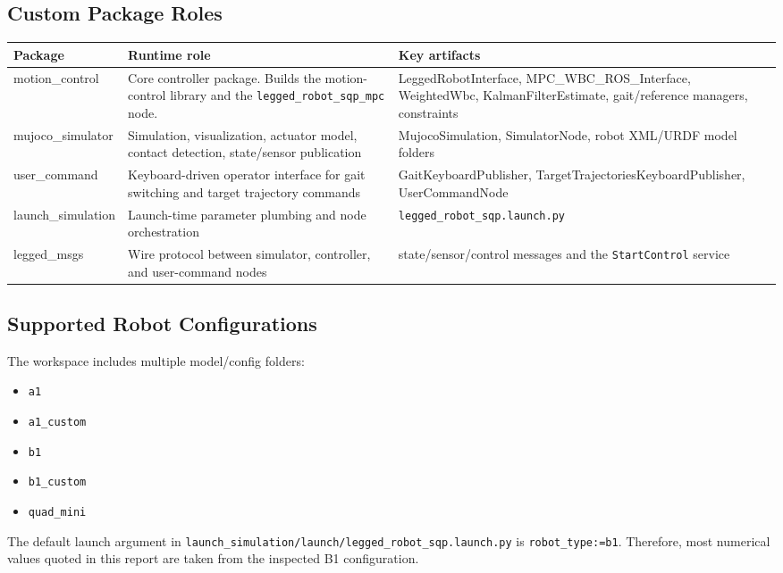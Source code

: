 \documentclass[11pt,a4paper]{article}
\newcommand{\code}[1]{\texttt{#1}}
\begin{document}
\subsection{Custom Package Roles}
\begin{table}[ht]
\centering
\small
\begin{tabularx}{\textwidth}{>{\ttfamily}l >{\raggedright\arraybackslash}X >{\raggedright\arraybackslash}X}
\toprule
Package & Runtime role & Key artifacts \\
\midrule
motion\_control & Core controller package. Builds the motion-control library and the \code{legged\_robot\_sqp\_mpc} node. & LeggedRobotInterface, MPC\_WBC\_ROS\_Interface, WeightedWbc, KalmanFilterEstimate, gait/reference managers, constraints \\
mujoco\_simulator & Simulation, visualization, actuator model, contact detection, state/sensor publication & MujocoSimulation, SimulatorNode, robot XML/URDF model folders \\
user\_command & Keyboard-driven operator interface for gait switching and target trajectory commands & GaitKeyboardPublisher, TargetTrajectoriesKeyboardPublisher, UserCommandNode \\
launch\_simulation & Launch-time parameter plumbing and node orchestration & \code{legged\_robot\_sqp.launch.py} \\
legged\_msgs & Wire protocol between simulator, controller, and user-command nodes & state/sensor/control messages and the \code{StartControl} service \\
\bottomrule
\end{tabularx}
\end{table}

\subsection{Supported Robot Configurations}
The workspace includes multiple model/config folders:
\begin{itemize}[leftmargin=*]
\item \code{a1}
\item \code{a1\_custom}
\item \code{b1}
\item \code{b1\_custom}
\item \code{quad\_mini}
\end{itemize}
The default launch argument in \code{launch\_simulation/launch/legged\_robot\_sqp.launch.py} is \code{robot\_type:=b1}. Therefore, most numerical values quoted in this report are taken from the inspected B1 configuration.
\end{document}
